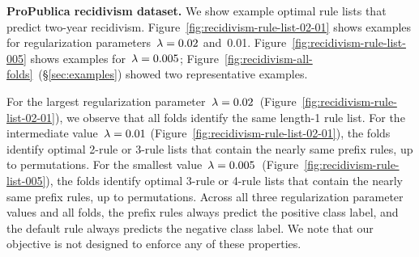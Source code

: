 \textbf{ProPublica recidivism dataset.}
We show example optimal rule lists that predict two-year recidivism.
%
Figure~\ref{fig:recidivism-rule-list-02-01} shows examples for
regularization parameters~${{\lambda} = 0.02}$ and~0.01.
%
Figure~\ref{fig:recidivism-rule-list-005} shows examples for~${{\lambda} = 0.005}$;
Figure~\ref{fig:recidivism-all-folds}~(\S\ref{sec:examples}) showed two representative examples.

For the largest regularization parameter~${{\lambda} = 0.02}$~(Figure~\ref{fig:recidivism-rule-list-02-01}),
we observe that all folds identify the same length-1 rule list.
%
For the intermediate value~${{\lambda} = 0.01}$ (Figure~\ref{fig:recidivism-rule-list-02-01}),
the folds identify optimal 2-rule or 3-rule lists that contain the nearly same prefix rules,
up to permutations.
%
For the smallest value~${{\lambda} = 0.005}$~(Figure~\ref{fig:recidivism-rule-list-005}),
the folds identify optimal 3-rule or 4-rule lists that contain the nearly same prefix rules,
up to permutations.
%
Across all three regularization parameter values and all folds,
the prefix rules always predict the positive class label,
and the default rule always predicts the negative class label.
%
We note that our objective is not designed to enforce any of these properties.

